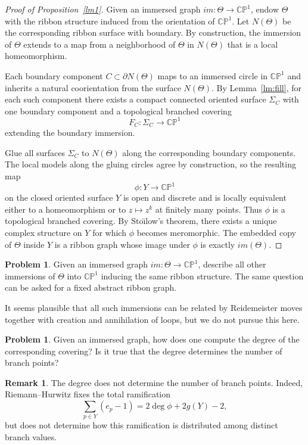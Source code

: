\documentclass[reqno]{amsart}
\theoremstyle{definition}
\newtheorem{remark}[theorem]{Remark}
\newtheorem{problem}[theorem]{Problem}
\newcommand {\bCP} {\mathbb {CP}}
\newcommand{\Si}{\Sigma}
\begin{document}
\begin{proof}[Proof of Proposition~\ref{lm1}]
Given an immersed graph $im:\Theta\to \bCP^1$, endow $\Theta$ with the ribbon structure induced from the orientation of $\bCP^1$. Let $N(\Theta)$ be the corresponding ribbon surface with boundary. By construction, the immersion of $\Theta$ extends to a map from a neighborhood of $\Theta$ in $N(\Theta)$ that is a local homeomorphism.

Each boundary component $C\subset \partial N(\Theta)$ maps to an immersed circle in $\bCP^1$ and inherits a natural coorientation from the surface $N(\Theta)$. By Lemma~\ref{lm:fill}, for each such component there exists a compact connected oriented surface $\Si_C$ with one boundary component and a topological branched covering
\[
F_C:\Si_C\to \bCP^1
\]
extending the boundary immersion.

Glue all surfaces $\Si_C$ to $N(\Theta)$ along the corresponding boundary components. The local models along the gluing circles agree by construction, so the resulting map
\[
\phi:Y\to \bCP^1
\]
on the closed oriented surface $Y$ is open and discrete and is locally equivalent either to a homeomorphism or to $z\mapsto z^k$ at finitely many points. Thus $\phi$ is a topological branched covering. By Sto\"{\i}low's theorem, there exists a unique complex structure on $Y$ for which $\phi$ becomes meromorphic. The embedded copy of $\Theta$ inside $Y$ is a ribbon graph whose image under $\phi$ is exactly $im(\Theta)$.
\end{proof}


\begin{problem}
Given an immersed graph $im:\Theta\to \bCP^1$, describe all other immersions of $\Theta$ into $\bCP^1$ inducing the same ribbon structure. The same question can be asked for a fixed abstract ribbon graph.
\end{problem}

It seems plausible that all such immersions can be related by Reidemeister moves together with creation and annihilation of loops, but we do not pursue this here.

\begin{problem}
Given an immersed graph, how does one compute the degree of the corresponding covering? Is it true that the degree determines the number of branch points?
\end{problem}

\begin{remark}
The degree does not determine the number of branch points. Indeed, Riemann--Hurwitz fixes the total ramification
\[
\sum_{p\in Y}(e_p-1)=2\deg\phi+2g(Y)-2,
\]
but does not determine how this ramification is distributed among distinct branch values.
\end{remark}
\end{document}
